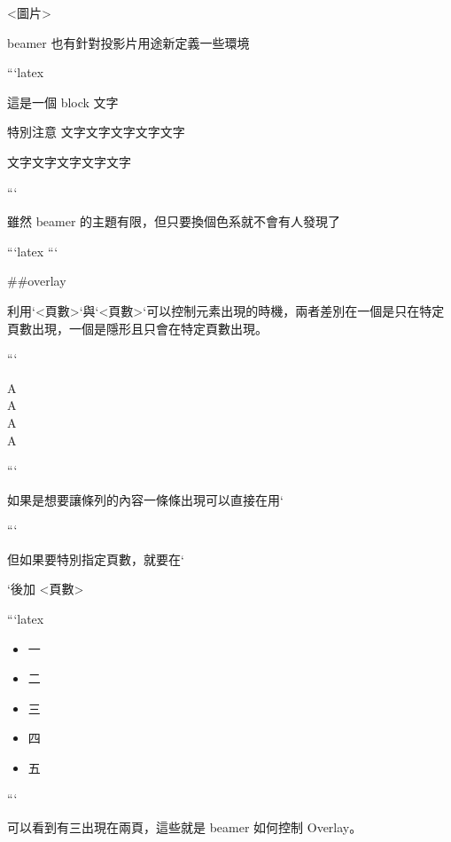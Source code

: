 \begin{markdown}
<圖片>

beamer 也有針對投影片用途新定義一些環境

```latex
\begin{block}{這是一個 block}
文字
\end{block}

\begin{alertblock}{特別注意}
文字文字文字文字文字
\end{alertblock}

\begin{examples}
文字文字文字文字文字
\end{examples}
```

雖然 beamer 的主題有限，但只要換個色系就不會有人發現了

```latex
```

##overlay

利用`\only<頁數>{}`與`\discover<頁數>{}`可以控制元素出現的時機，兩者差別在一個是只在特定頁數出現，一個是隱形且只會在特定頁數出現。

```
\begin{center}
A\\
A\\
A\\
A\\
\end{center}
```

如果是想要讓條列的內容一條條出現可以直接在用` 
```

但如果要特別指定頁數，就要在`\item `後加 <頁數>

```latex
\begin{itemize}[<+->]
\item<1-> 一
\item<2> 二
\item<3-4> 三
\item<4> 四
\item<5> 五
\end{itemize} 
```

可以看到有三出現在兩頁，這些就是 beamer 如何控制 Overlay。

\end{markdown}
